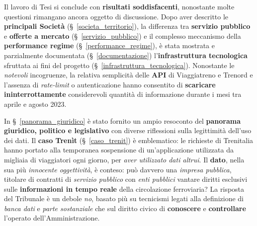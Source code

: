 \documentclass[12pt,a4paper,italian]{report}
\begin{document}
Il lavoro di Tesi si conclude con \textbf{risultati soddisfacenti},
nonostante molte questioni rimangano ancora oggetto di discussione.
Dopo aver descritto le \textbf{principali
    Società} (\S~\ref{societa_territorio}), la differenza tra
\textbf{servizio pubblico} e \textbf{offerte a mercato}
(\S~\ref{servizio_pubblico}) e il complesso meccanismo della
\textbf{performance regime} (\S~\ref{performance_regime}), è stata
mostrata e parzialmente documentata (\S~\ref{documentazione})
l'\textbf{infrastruttura tecnologica} sfruttata ai fini del progetto
(\S~\ref{infrastruttura_tecnologica}).  Nonostante le
\textit{notevoli} incogruenze, la relativa semplicità delle
\textbf{API} di Viaggiatreno e Trenord e l'assenza di
\textit{rate-limit} o autenticazione hanno consentito di
\textbf{scaricare ininterrottamente} considerevoli quantità di
informazione durante i mesi tra aprile e agosto 2023.

In \S~\ref{panorama_giuridico} è stato fornito un ampio resoconto del
\textbf{panorama giuridico, politico e legislativo} con diverse
riflessioni sulla legittimità dell'uso dei dati.  Il \textbf{caso
    Trenìt} (\S~\ref{caso_trenit}) è emblematico: le richieste di
Trenitalia hanno portato alla temporanea sospensione di
un'applicazione utilizzata da migliaia di viaggiatori ogni giorno, per
\textit{aver utilizzato dati altrui}.  Il \textbf{dato}, nella sua più
\textit{innocente oggettività}, è conteso: può davvero una
\textit{impresa pubblica}, titolare di contratti di \textit{servizio
    pubblico} con \textit{enti pubblici} vantare diritti esclusivi
sulle \textbf{informazioni in tempo reale} della circolazione
ferroviaria?  La risposta del Tribunale è un debole \textit{no},
basato più su tecnicismi legati alla definizione di \textit{banca
    dati} e \textit{parte sostanziale} che sul diritto civico di
\textbf{conoscere} e \textbf{controllare} l'operato
dell'Amministrazione.
\end{document}
